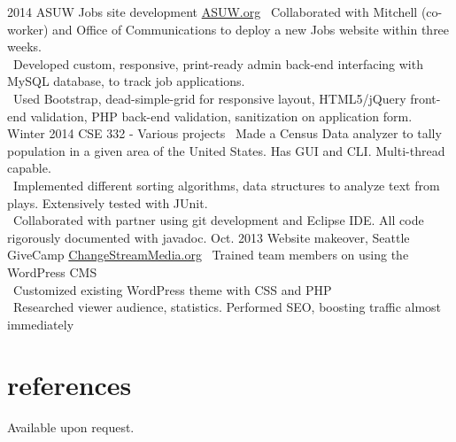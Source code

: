 \documentclass[]{friggeri-cv}
\begin{document}
\begin{entrylist}
  \entry
    {2014}
    {ASUW Jobs site development}
    {\href{http://jobs.asuw.org}{ASUW.org}}
    {\bullet \, Collaborated with Mitchell (co-worker) and Office of Communications to deploy a new Jobs website within three weeks. \\
    \bullet \, Developed custom, responsive, print-ready admin back-end interfacing with MySQL database, to track job applications. \\
    \bullet \, Used Bootstrap, dead-simple-grid for responsive layout, HTML5/jQuery front-end validation, PHP back-end validation, sanitization on application form.
    }
  \entry
    {Winter 2014}
    {CSE 332 - Various projects}
    {}
    {\bullet \, Made a Census Data analyzer to tally population in a given area of the United States. Has GUI and CLI. Multi-thread capable. \\
    \bullet \, Implemented different sorting algorithms, data structures to analyze text from plays. Extensively tested with JUnit. \\
    \bullet \, Collaborated with partner using git development and Eclipse IDE. All code rigorously documented with javadoc.}
  \entry
    {Oct. 2013}
    {Website makeover, Seattle GiveCamp}
    {\href{http://changestreammedia.org}{ChangeStreamMedia.org}}
    {\bullet \, Trained team members on using the WordPress CMS \\
    \bullet \, Customized existing WordPress theme with CSS and PHP \\
    \bullet \, Researched viewer audience, statistics. Performed SEO, boosting traffic almost immediately}
\end{entrylist}

\pagebreak

\section{references}

Available upon request.
\end{document}
